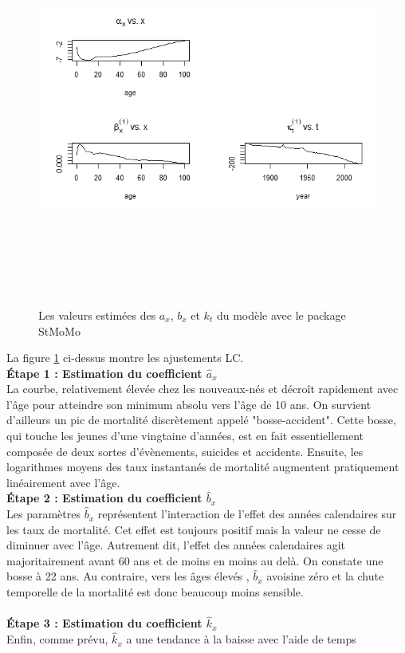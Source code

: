\documentclass[french]{report}
\begin{document}
\begin{figure}[hhhhhhhh!]
    \centering
    \includegraphics[width=15cm, height=13cm]{estimation_param_avec_stMoMo_fit.png}
    \caption{Les valeurs estimées des  ${a}_{x}$, ${{b}}_{x}$ et ${k}_{t}$ du modèle avec le package StMoMo}
    \label{fig:stmomo_estimation.png}
\end{figure}
\newpage

La figure \ref{fig:stmomo_estimation.png} ci-dessus montre les ajustements LC.
\newline
\\ \textbf{ Étape 1 : Estimation du coefficient $\hat{{a}}_{x}$} \\
La courbe, relativement élevée chez les nouveaux-nés et décroît rapidement avec l’âge pour atteindre son minimum absolu vers l’âge de 10 ans. On survient d’ailleurs un pic de mortalité discrètement appelé "bosse-accident". Cette bosse, qui touche les jeunes d’une vingtaine d’années, est en fait essentiellement composée de deux sortes d'évènements, suicides et accidents. Ensuite, les logarithmes moyens des taux instantanés de mortalité augmentent pratiquement linéairement avec l’âge.
\\ \textbf{ Étape 2 : Estimation du coefficient $\hat{{b}}_{x}$} \\
Les paramètres $\hat{{b}}_{x}$ représentent l’interaction de l’effet des années calendaires sur les taux de mortalité. Cet effet est toujours positif mais la valeur ne cesse de diminuer avec l’âge. Autrement dit, l’effet des années calendaires agit majoritairement avant 60 ans et de moins en moins au delà. On constate une bosse à 22 ans.
Au contraire, vers les âges élevés , $\hat{{b}}_{x}$ avoisine zéro et la chute temporelle de la mortalité est donc beaucoup moins sensible.
\\
\\ \textbf{ Étape 3 : Estimation du coefficient $\hat{{k}}_{x}$} \\
Enfin, comme prévu, $\hat{{k}}_{x}$ a une tendance à la baisse avec l'aide de temps
\end{document}
